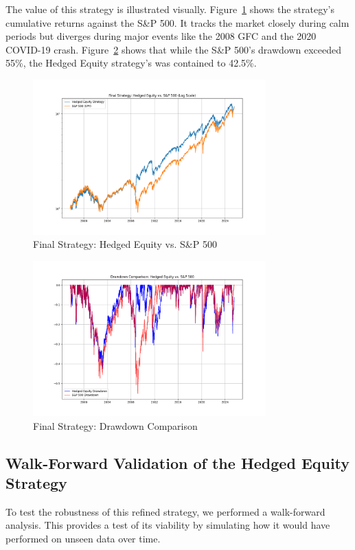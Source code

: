 \documentclass{article}
\begin{document}
The value of this strategy is illustrated visually. Figure~\ref{fig:hedged_equity_curve} shows the strategy's cumulative returns against the S\&P 500. It tracks the market closely during calm periods but diverges during major events like the 2008 GFC and the 2020 COVID-19 crash. Figure~\ref{fig:hedged_equity_drawdowns} shows that while the S\&P 500's drawdown exceeded 55\%, the Hedged Equity strategy's was contained to 42.5\%.

\begin{figure}[htbp]
    \centering
    \includegraphics[width=0.8\textwidth]{plot_hedged_equity_curve.png}
    \caption{Final Strategy: Hedged Equity vs. S\&P 500}
    \label{fig:hedged_equity_curve}
\end{figure}

\begin{figure}[htbp]
    \centering
    \includegraphics[width=0.8\textwidth]{plot_hedged_equity_drawdowns.png}
    \caption{Final Strategy: Drawdown Comparison}
    \label{fig:hedged_equity_drawdowns}
\end{figure}

\subsection{Walk-Forward Validation of the Hedged Equity Strategy}
To test the robustness of this refined strategy, we performed a walk-forward analysis. This provides a test of its viability by simulating how it would have performed on unseen data over time.
\end{document}

